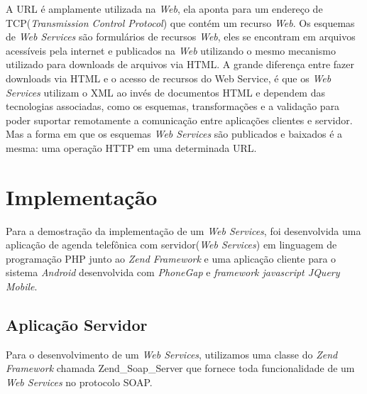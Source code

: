 \documentclass{acm_proc_article-sp}
\begin{document}
			
			A URL é amplamente utilizada na \emph{Web}, ela aponta para um endereço de TCP(\emph{Transmission Control Protocol}) que contém um recurso \emph{Web}. Os esquemas de \emph{Web Services} são formulários de recursos \emph{Web}, eles se encontram em arquivos acessíveis pela internet e publicados na \emph{Web} utilizando o mesmo mecanismo utilizado para downloads de arquivos via HTML. A grande diferença entre fazer downloads via HTML e o acesso de recursos do Web Service, é que os \emph{Web Services} utilizam o XML ao invés de documentos HTML e dependem das tecnologias associadas, como os esquemas, transformações e a validação para poder suportar remotamente a comunicação entre aplicações clientes e servidor. Mas a forma em que os esquemas \emph{Web Services} são publicados e baixados é a mesma: uma operação HTTP em uma determinada URL.\cite{UNDERWEBSERVICES}

			
		
\section{Implementação}


	Para a demostração da implementação de um \emph{Web Services}, foi desenvolvida uma aplicação de agenda telefônica com servidor(\emph{Web Services}) em linguagem de programação PHP junto ao \emph{Zend Framework} e uma aplicação cliente para o sistema \emph{Android} desenvolvida com \emph{PhoneGap} e \emph{framework javascript JQuery Mobile}.
	
	\subsection{Aplicação Servidor}

	Para o desenvolvimento de um \emph{Web Services}, utilizamos uma classe do \emph{Zend Framework} chamada Zend\_Soap\_Server que fornece toda funcionalidade de um \emph{Web Services} no protocolo SOAP. 
	
\end{document}
